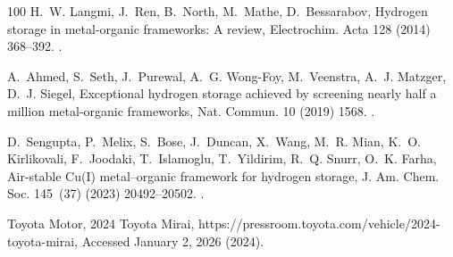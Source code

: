 \documentclass[review]{elsarticle}
\begin{document}
\begin{thebibliography}{100}
H.~W. Langmi, J.~Ren, B.~North, M.~Mathe, D.~Bessarabov, Hydrogen storage in
  metal-organic frameworks: A review, Electrochim. Acta 128 (2014) 368--392.
\newblock \href {https://doi.org/10.1016/j.electacta.2013.10.190}
  {}.

A.~Ahmed, S.~Seth, J.~Purewal, A.~G. Wong-Foy, M.~Veenstra, A.~J. Matzger,
  D.~J. Siegel, Exceptional hydrogen storage achieved by screening nearly half
  a million metal-organic frameworks, Nat. Commun. 10 (2019) 1568.
\newblock \href {https://doi.org/10.1038/s41467-019-09365-w}
  {}.

D.~Sengupta, P.~Melix, S.~Bose, J.~Duncan, X.~Wang, M.~R. Mian, K.~O.
  Kirlikovali, F.~Joodaki, T.~Islamoglu, T.~Yildirim, R.~Q. Snurr, O.~K. Farha,
  Air-stable {Cu(I)} metal–organic framework for hydrogen storage, J. Am.
  Chem. Soc. 145~(37) (2023) 20492--20502.
\newblock \href {https://doi.org/10.1021/jacs.3c06393}
  {}.

{Toyota Motor}, {2024 Toyota Mirai},
  https://pressroom.toyota.com/vehicle/2024-toyota-mirai, {Accessed January 2,
  2026} (2024).

\end{thebibliography}
\end{document}
